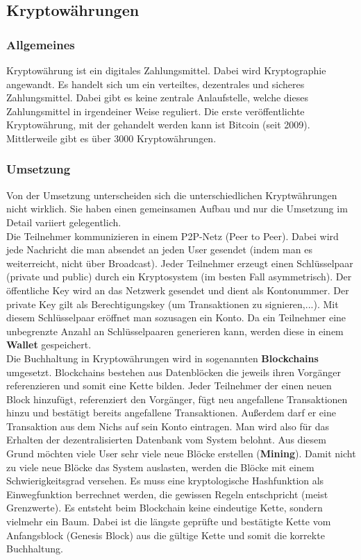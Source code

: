 
\subsection{Kryptowährungen}
\subsubsection{Allgemeines}
Kryptowährung ist ein digitales Zahlungsmittel. Dabei wird Kryptographie angewandt. Es handelt sich um ein verteiltes, dezentrales und sicheres Zahlungsmittel. Dabei gibt es keine zentrale Anlaufstelle, welche dieses Zahlungsmittel in irgendeiner Weise reguliert. Die erste veröffentlichte Kryptowährung, mit der gehandelt werden kann ist Bitcoin (seit 2009). Mittlerweile gibt es über 3000 Kryptowährungen.
\subsubsection{Umsetzung}
Von der Umsetzung unterscheiden sich die unterschiedlichen Kryptwährungen nicht wirklich. Sie haben einen gemeinsamen Aufbau und nur die Umsetzung im Detail variiert gelegentlich.\\

Die Teilnehmer kommunizieren in einem P2P-Netz (Peer to Peer). Dabei wird jede Nachricht die man absendet an jeden User gesendet (indem man es weiterreicht, nicht über Broadcast).
Jeder Teilnehmer erzeugt einen Schlüsselpaar (private und public) durch ein Kryptosystem (im besten Fall asymmetrisch). Der öffentliche Key wird an das Netzwerk gesendet und dient als Kontonummer. Der private Key gilt als Berechtigungskey (um Transaktionen zu signieren,...). Mit diesem Schlüsselpaar eröffnet man sozusagen ein Konto. Da ein Teilnehmer eine unbegrenzte Anzahl an Schlüsselpaaren generieren kann, werden diese in einem \textbf{Wallet} gespeichert.\\

Die Buchhaltung in Kryptowährungen wird in sogenannten \textbf{Blockchains} umgesetzt. Blockchains bestehen aus Datenblöcken die jeweils ihren Vorgänger referenzieren und somit eine Kette bilden. Jeder Teilnehmer der einen neuen Block hinzufügt, referenziert den Vorgänger, fügt neu angefallene Transaktionen hinzu und bestätigt bereits angefallene Transaktionen. Außerdem darf er eine Transaktion aus dem Nichs auf sein Konto eintragen. Man wird also für das Erhalten der dezentralisierten Datenbank vom System belohnt. Aus diesem Grund möchten viele User sehr viele neue Blöcke erstellen (\textbf{Mining}). Damit nicht zu viele neue Blöcke das System auslasten, werden die Blöcke mit einem Schwierigkeitsgrad versehen. Es muss eine kryptologische Hashfunktion als Einwegfunktion berrechnet werden, die gewissen Regeln entschpricht (meist Grenzwerte). Es entsteht beim Blockchain keine eindeutige Kette, sondern vielmehr ein Baum. Dabei ist die längste geprüfte und bestätigte Kette vom Anfangsblock (Genesis Block) aus die gültige Kette und somit die korrekte Buchhaltung. \\

